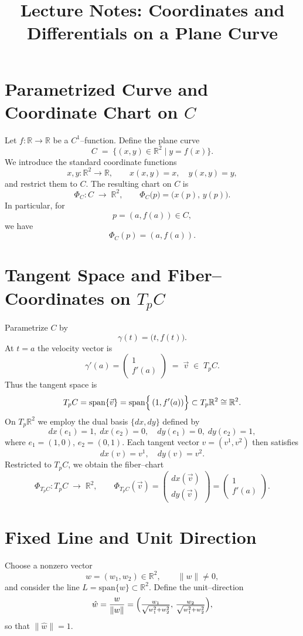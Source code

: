 \documentclass[12pt]{article}
\title{Lecture Notes: Coordinates and Differentials on a Plane Curve}
\author{}
\date{}
\theoremstyle{definitionstyle}
\begin{document}
\maketitle
	
\section{Parametrized Curve and Coordinate Chart on \(C\)}
Let \(f\colon\mathbb{R}\to\mathbb{R}\) be a \(C^1\)–function.  Define the plane curve
\[
C \;=\;\bigl\{(x,y)\in\mathbb{R}^2 \;\big|\; y=f(x)\bigr\}.
\]
We introduce the standard coordinate functions
\[
x,y\colon\mathbb{R}^2\to\mathbb{R},
\qquad
x(x,y)=x,
\quad
y(x,y)=y,
\]
and restrict them to \(C\).  The resulting chart on \(C\) is
\[
\Phi_C\colon C\;\longrightarrow\;\mathbb{R}^2,
\qquad
\Phi_C\bigl(p\bigr)
=\bigl(x(p),\,y(p)\bigr).
\]
In particular, for
\[
p=(a,f(a))\in C,
\]
we have
\[
\Phi_C(p)=(a,f(a)).
\]

\section{Tangent Space and Fiber–Coordinates on \(T_pC\)}
Parametrize \(C\) by
\[
\gamma(t) = \bigl(t,f(t)\bigr).
\]
At \(t=a\) the velocity vector is
\[
\gamma'(a)
=\begin{pmatrix}
	1\\
	f'(a)
\end{pmatrix}
\;=\;\vec v
\;\in\;T_pC.
\]
Thus the tangent space is
\[
T_pC
=\mathrm{span}\{\vec v\}
=\mathrm{span}\Bigl\{\,(1,f'(a))\Bigr\}
\subset T_p\mathbb{R}^2\cong\mathbb{R}^2.
\]
On \(T_p\mathbb{R}^2\) we employ the dual basis \(\{dx,dy\}\) defined by
\[
dx(e_1)=1,\;dx(e_2)=0,
\quad
dy(e_1)=0,\;dy(e_2)=1,
\]
where \(e_1=(1,0)\), \(e_2=(0,1)\).  Each tangent vector \(v=(v^1,v^2)\) then satisfies
\[
dx(v)=v^1,
\quad
dy(v)=v^2.
\]
Restricted to \(T_pC\), we obtain the fiber–chart
\[
\Phi_{T_pC}\colon T_pC\;\longrightarrow\;\mathbb{R}^2,
\qquad
\Phi_{T_pC}(\vec v)
=\begin{pmatrix}
	dx(\vec v)\\[4pt]
	dy(\vec v)
\end{pmatrix}
=\begin{pmatrix}
	1\\
	f'(a)
\end{pmatrix}.
\]

\section{Fixed Line and Unit Direction}
Choose a nonzero vector
\[
w=(w_1,w_2)\in\mathbb{R}^2,
\qquad
\|w\|\neq0,
\]
and consider the line \(L=\mathrm{span}\{w\}\subset\mathbb{R}^2\).  Define the unit–direction
\[
\hat w
=\frac{w}{\|w\|}
=\Bigl(\tfrac{w_1}{\sqrt{w_1^2+w_2^2}},\,\tfrac{w_2}{\sqrt{w_1^2+w_2^2}}\Bigr),
\]
so that \(\|\hat w\|=1\).
\end{document}
